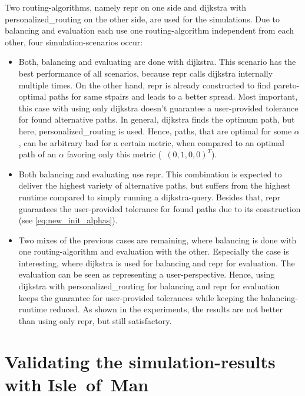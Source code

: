     Two routing-algorithms, namely \gls{repr} on one side and \gls{dijkstra} with \gls{personalized_routing} on the other side, are used for the simulations.
    Due to \gls{balancing} and evaluation each use one routing-algorithm independent from each other, four simulation-scenarios occur:
    \begin{itemize}
        \item Both, \gls{balancing} and evaluating are done with \gls{dijkstra}.
            This scenario has the best performance of all scenarios, because \gls{repr} calls \gls{dijkstra} internally multiple times.
            On the other hand, \gls{repr} is already constructed to find pareto-optimal paths for same \glspl{stpair} and leads to a better spread.
            Most important, this case with using only \gls{dijkstra} doesn't guarantee a user-provided tolerance for found alternative paths.
            In general, \gls{dijkstra} finds the optimum path, but here, \gls{personalized_routing} is used.
            Hence, paths, that are optimal for some $\alpha$, can be arbitrary bad for a certain \gls{metric}, when compared to an optimal path of an $\alpha$ favoring only this \gls{metric} (\eg\ $(0, 1, 0, 0)^T$).
        \item Both \gls{balancing} and evaluating use \gls{repr}.
            This combination is expected to deliver the highest variety of alternative paths, but suffers from the highest runtime compared to simply running a \gls{dijkstra}-query.
            Besides that, \gls{repr} guarantees the user-provided tolerance for found paths due to its construction (see \vref{eq:new_init_alphas}).
        \item Two mixes of the previous cases are remaining, where \gls{balancing} is done with one routing-algorithm and evaluation with the other.
            Especially the case is interesting, where \gls{dijkstra} is used for \gls{balancing} and \gls{repr} for evaluation.
            The evaluation can be seen as representing a user-perspective.
            Hence, using \gls{dijkstra} with \gls{personalized_routing} for \gls{balancing} and \gls{repr} for evaluation keeps the guarantee for user-provided tolerances while keeping the \gls{balancing}-runtime reduced.
            As shown in the experiments, the results are not better than using only \gls{repr}, but still satisfactory.
    \end{itemize}

\section{Validating the simulation-results with Isle~of~Man}

